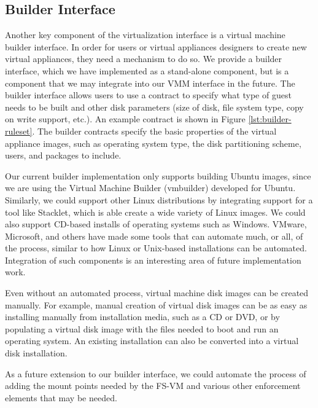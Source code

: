 \subsection{Builder Interface}
\label{sec:builder-implementation}

Another key component of the virtualization interface is a virtual machine builder interface. In order for users or virtual appliances designers to create new virtual appliances, they need a mechanism to do so. We provide a builder interface, which we have implemented as a stand-alone component, but is a component that we may integrate into our VMM interface in the future. The builder interface allows users to use a contract to specify what type of guest needs to be built and other disk parameters (size of disk, file system type, copy on write support, etc.). An example contract is shown in Figure \ref{lst:builder-ruleset}. The builder contracts specify the basic properties of the virtual appliance images, such as operating system type, the disk partitioning scheme, users, and packages to include.

Our current builder implementation only supports building Ubuntu images, since we are using the Virtual Machine Builder (vmbuilder)\cite{vmbuilder_website} developed for Ubuntu. Similarly, we could support other Linux distributions by integrating support for a tool like Stacklet\cite{stacklet_website}, which is able create a wide variety of Linux images. We could also support CD-based installs of operating systems such as Windows. VMware, Microsoft, and others have made some tools that can automate much, or all, of the process, similar to how Linux or Unix-based installations can be automated. Integration of such components is an interesting area of future implementation work.

Even without an automated process, virtual machine disk images can be created manually. For example, manual creation of virtual disk images can be as easy as installing manually from installation media, such as a CD or DVD, or by populating a virtual disk image with the files needed to boot and run an operating system. An existing installation can also be converted into a virtual disk installation\cite{runningxen_book}.

As a future extension to our builder interface, we could automate the process of adding the mount points needed by the FS-VM and various other enforcement elements that may be needed.

